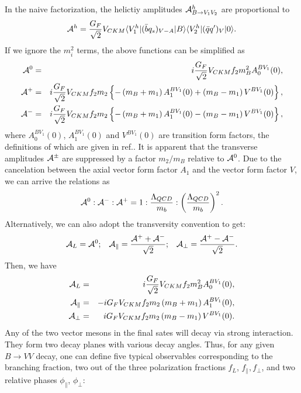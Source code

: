 \documentclass[11pt]{article}
\begin{document}
In the naive factorization, the helictiy amplitudes ${\cal A}^h_{ B\to V_1V_2}$ are proportional to
\begin{eqnarray}
 {\cal A}^h=\frac{G_F}{\sqrt 2}V_{CKM}\langle V_1^h|(\bar{b} q_s)_{V-A}| B\rangle\langle V_2^h|(\bar q q^\prime)_V|0\rangle .
\end{eqnarray}
If we ignore the  $m_i^2$ terms, the above functions can be simplified as
\begin{eqnarray}
{\cal A}^0&=&i\frac{G_F}{\sqrt 2}V_{CKM}f_2m_B^2A_0^{BV_1}(0),\\
{\cal A}^+&=&i\frac{G_F}{\sqrt 2}V_{CKM}f_2m_2\left\{- \left(m_B+m_1\right) A_1^{BV_1}(0)+ \left(m_B-m_1\right)V^{BV_1}(0)\right\}, \\
{\cal A}^-&=&i\frac{G_F}{\sqrt 2}V_{CKM}f_2m_2\left\{ -\left(m_B+m_1\right) A_1^{BV_1}(0)- \left(m_B-m_1\right)V^{BV_1}(0)\right\},
\end{eqnarray}
where $A_0^{BV_1}(0)$, $A_1^{BV_1}(0)$ and $V^{BV_1}(0)$ are transition form factors, the definitions of which   are given in ref.\cite{Wirbel:1985ji}. It is apparent that the transverse amplitudes ${\cal A}^\pm$ are suppressed by a factor $m_2/m_B$ relative to  ${\cal A}^0$. Due to the cancelation between the axial vector form factor $A_1$ and the vector  form factor $V$, we can arrive the relations as
\begin{eqnarray} \label{herachy}
{\cal A}^0:{\cal A}^-:{\cal A}^+=1:\frac{\Lambda_{QCD}}{m_b}:\left(\frac{\Lambda_{QCD}}{m_b}\right)^2.
\end{eqnarray}
Alternatively, we  can also adopt the transversity convention to get:
\begin{eqnarray}
{\cal A}_{L}={\cal A}^0;\,\,\,\,\,
{\cal A}_{\parallel}=\frac{{\cal A}^++{\cal A}^-}{\sqrt 2};\,\,\,\,\,
{\cal A}_{\perp}=\frac{{\cal A}^+-{\cal A}^-}{\sqrt 2}.
\end{eqnarray}
Then, we have
\begin{eqnarray}
{\cal A}_L&=&i\frac{G_F}{\sqrt 2}V_{CKM}f_2m_B^2A_0^{BV_1}(0),\\
{\cal A}_\parallel&=&-iG_FV_{CKM}f_2m_2 \left(m_B+m_1\right) A_1^{BV_1}(0), \\
{\cal A}_\perp&=&iG_FV_{CKM}f_2m_2\left(m_B-m_1\right)V^{BV_1}(0).
\end{eqnarray}
Any of the two vector mesons in the final sates will decay via strong interaction. They form two decay planes with various decay angles. Thus, for any given $B\to VV$ decay, one can define five typical observables corresponding to the branching fraction, two out of the three polarization fractions $f_L$, $f_\parallel, f_\perp$, and two relative phases $\phi_\parallel$, $\phi_\perp$:
\end{document}
